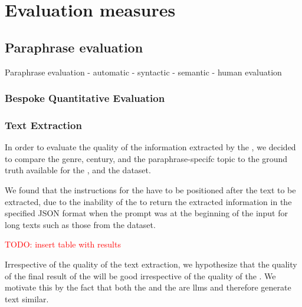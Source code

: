 \section{Evaluation measures}
\label{sec:evaluation_measures}



\subsection{Paraphrase evaluation}
\label{subsec:paraphrase_evaluation}

 Paraphrase evaluation
    - automatic
        - syntactic 
        - semantic
    - human evaluation



\subsubsection{Bespoke Quantitative Evaluation}
\label{subsec:custom_quantitative_evaluation}

\subsubsection{Text Extraction}
\label{subsec:text_extraction}

In order to evaluate the quality of the information extracted by the \pextractor{}, 
we decided to compare the genre, century, and the paraphrase-specifc topic to the 
ground truth available for the \dataBlog{}, \dataGutenberg{} and the \dataCustom{} dataset.

We found that the instructions for the \pextractor{} have to be positioned after the text to be extracted, 
due to the inability of the \pextractor{} to return the extracted information in the specified JSON format 
when the prompt was at the beginning of the input for long texts such as those from the \dataGutenberg{} dataset.

\textcolor{red}{TODO: insert table with results}

Irrespective of the quality of the text extraction, we hypothesize that the quality of the final result of the \pgenerator{} will be good irrespective of the quality of the \pextractor{}.
We motivate this by the fact that both the \pextractor{} and the \pgenerator{} are \acp{llm} and therefore generate text similar.

